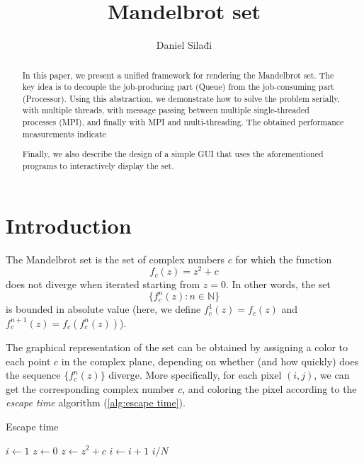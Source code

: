 \documentclass[a4paper]{article}
\begin{document}
\title{Mandelbrot set}

\author{Daniel Silađi}



\maketitle


\begin{abstract} {}
	In this paper, we present a unified framework for rendering the Mandelbrot set. The key idea is to decouple the job-producing part (Queue) from the job-consuming part (Processor). Using this abstraction, we demonstrate how to solve the problem serially, with multiple threads, with message passing between multiple single-threaded processes (MPI), and finally with MPI and multi-threading.
	The obtained performance measurements indicate
	
	Finally, we also describe the design of a simple GUI that uses the aforementioned programs to interactively display the set.
\end{abstract}

\section{Introduction}
	The Mandelbrot set is the set of complex numbers $c$ for which the function \[f_c(z) = z^2 + c\]
	does not diverge when iterated starting from $z=0$. In other words, the set \[\{f_c^n(z) : n\in \mathbb N\}\]
	is bounded in absolute value (here, we define $f_c^1(z) = f_c(z)$ and $f_c^{n+1} (z) = f_c(f_c^n (z))$). 
	
	The graphical representation of the set can be obtained by assigning a color to each point $c$ in the complex plane, depending on whether (and how quickly) does the sequence $\{f_c^n(z)\}$ diverge. More specifically, for each pixel $(i, j)$, we can get the corresponding complex number $c$, and coloring the pixel according to the \emph{escape time} algorithm (\ref{alg:escape time}).
	
	\begin{algorithm}[h]
		\caption{Escape time} \label{alg:escape time}
		\begin{algorithmic}[1]
				\State $i \gets 1$
				\State $z \gets 0$
					\State $z \gets z^2 + c$
					\State $i \gets i+1$
				\EndWhile
				\State \Return $i/N$
			\EndFunction
		\end{algorithmic}
	\end{algorithm}
	
\end{document}
